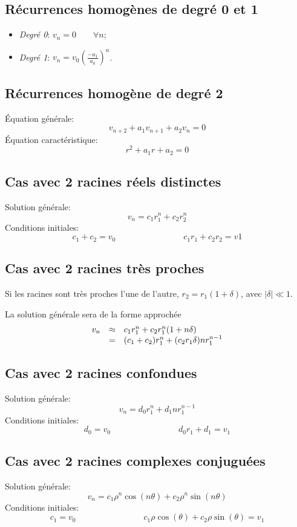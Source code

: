 \subsection{Récurrences homogènes de degré 0 et 1}
\begin{itemize}
  \item \emph{Degré 0}: $v_n = 0 \qquad \forall n$;
  \item \emph{Degré 1}: $v_n = v_0\left (\frac{-a_1}{a_0} \right )^n$.
\end{itemize}

\subsection{Récurrences homogène de degré 2}
Équation générale:
\[ v_{n+2} + a_1v_{n+1} + a_2v_n = 0 \]
Équation caractéristique:
\[ r^2 + a_1r + a_2 = 0 \]

\subsection{Cas avec 2 racines réels distinctes}
Solution générale:
\[ v_n = c_1r_1^n + c_2r_2^n \]
Conditions initiales:
\[ c_1 + c_2 = v_0 \qquad{\qquad{\qquad{\qquad}}} c_1r_1 + c_2r_2 = v1 \]

\subsection{Cas avec 2 racines très proches}
Si les racines sont très proches l'une de l'autre,
$r_2 = r_1(1 + \delta )$, avec $|\delta | \ll 1$.

La solution générale sera de la forme approchée
\[
  \begin{array}{r c l}
    v_n &\approx &c_1r_1^n + c_2r_1^n(1 + n\delta)\\
    &=&(c_1 + c_2)r_1^n + (c_2r_1\delta )nr_1^{n-1}
  \end{array}
\]

\subsection{Cas avec 2 racines confondues}
Solution générale:
\[ v_n = d_0r_1^n + d_1nr_1^{n-1} \]
Conditions initiales:
\[ d_0 = v_0 \qquad{\qquad{\qquad{\qquad}}} d_0r_1 + d_1 = v_1 \]

\subsection{Cas avec 2 racines complexes conjuguées}
Solution générale:
\[ v_n = c_1\rho{^n}\cos{(n\theta)} + c_2\rho{^n}\sin{(n\theta)} \]
Conditions initiales:
\[ c_1 = v_0 \qquad{\qquad{\qquad{\qquad}}}
c_1\rho\cos{(\theta)} + c_2\rho\sin{(\theta)} = v_1 \]

